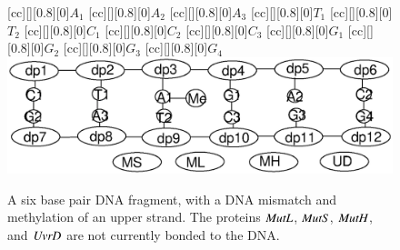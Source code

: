 \begin{figure}[h!]
[cc][][0.8][0]{$A_1$}
[cc][][0.8][0]{$A_2$}
[cc][][0.8][0]{$A_3$}
[cc][][0.8][0]{$T_1$}
[cc][][0.8][0]{$T_2$}
[cc][][0.8][0]{$C_1$}
[cc][][0.8][0]{$C_2$}
[cc][][0.8][0]{$C_3$}
[cc][][0.8][0]{$G_1$}
[cc][][0.8][0]{$G_2$}
[cc][][0.8][0]{$G_3$}
[cc][][0.8][0]{$G_4$}
  \centering
    \includegraphics[width=1.0\textwidth]{mmr/state1}
  \caption[A six base pair DNA fragment.]{A six base pair DNA fragment, with a DNA mismatch and methylation of an upper strand. The proteins $\mathit{MutL}$, $\mathit{MutS}$, $\mathit{MutH}$, and $\mathit{UvrD}$ are not currently bonded to the DNA.}
  \label{fig:state1}
\end{figure}

